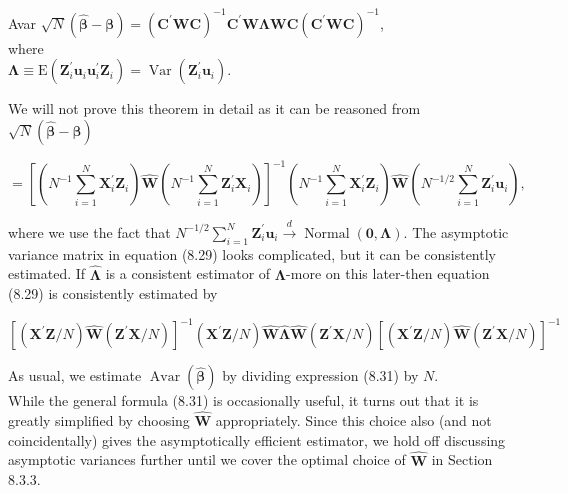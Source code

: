 \documentclass[10pt]{article}
\begin{document}
Avar $\sqrt{N}(\hat{\boldsymbol{\beta}}-\boldsymbol{\beta})=\left(\mathbf{C}^{\prime} \mathbf{W C}\right)^{-1} \mathbf{C}^{\prime} \mathbf{W} \mathbf{\Lambda W C}\left(\mathbf{C}^{\prime} \mathbf{W C}\right)^{-1}$,\\
where\\
$\boldsymbol{\Lambda} \equiv \mathrm{E}\left(\mathbf{Z}_{i}^{\prime} \mathbf{u}_{i} \mathbf{u}_{i}^{\prime} \mathbf{Z}_{i}\right)=\operatorname{Var}\left(\mathbf{Z}_{i}^{\prime} \mathbf{u}_{i}\right)$.

We will not prove this theorem in detail as it can be reasoned from\\
$\sqrt{N}(\hat{\boldsymbol{\beta}}-\boldsymbol{\beta})$

$$
=\left[\left(N^{-1} \sum_{i=1}^{N} \mathbf{X}_{i}^{\prime} \mathbf{Z}_{i}\right) \hat{\mathbf{W}}\left(N^{-1} \sum_{i=1}^{N} \mathbf{Z}_{i}^{\prime} \mathbf{X}_{i}\right)\right]^{-1}\left(N^{-1} \sum_{i=1}^{N} \mathbf{X}_{i}^{\prime} \mathbf{Z}_{i}\right) \hat{\mathbf{W}}\left(N^{-1 / 2} \sum_{i=1}^{N} \mathbf{Z}_{i}^{\prime} \mathbf{u}_{i}\right),
$$

where we use the fact that $N^{-1 / 2} \sum_{i=1}^{N} \mathbf{Z}_{i}^{\prime} \mathbf{u}_{i} \xrightarrow{d} \operatorname{Normal}(\mathbf{0}, \boldsymbol{\Lambda})$. The asymptotic variance matrix in equation (8.29) looks complicated, but it can be consistently estimated. If $\hat{\boldsymbol{\Lambda}}$ is a consistent estimator of $\boldsymbol{\Lambda}$-more on this later-then equation (8.29) is consistently estimated by


\begin{equation*}
\left[\left(\mathbf{X}^{\prime} \mathbf{Z} / N\right) \hat{\mathbf{W}}\left(\mathbf{Z}^{\prime} \mathbf{X} / N\right)\right]^{-1}\left(\mathbf{X}^{\prime} \mathbf{Z} / N\right) \hat{\mathbf{W}} \hat{\mathbf{\Lambda}} \hat{\mathbf{W}}\left(\mathbf{Z}^{\prime} \mathbf{X} / N\right)\left[\left(\mathbf{X}^{\prime} \mathbf{Z} / N\right) \hat{\mathbf{W}}\left(\mathbf{Z}^{\prime} \mathbf{X} / N\right)\right]^{-1} \tag{8.31}
\end{equation*}


As usual, we estimate $\operatorname{Avar}(\hat{\boldsymbol{\beta}})$ by dividing expression (8.31) by $N$.\\
While the general formula (8.31) is occasionally useful, it turns out that it is greatly simplified by choosing $\hat{\mathbf{W}}$ appropriately. Since this choice also (and not coincidentally) gives the asymptotically efficient estimator, we hold off discussing asymptotic variances further until we cover the optimal choice of $\hat{\mathbf{W}}$ in Section 8.3.3.
\end{document}
